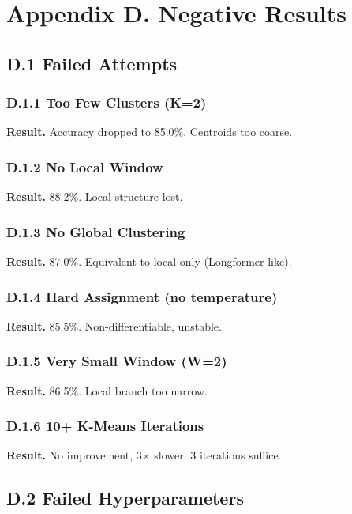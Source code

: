 \section{Appendix D. Negative Results}

\subsection{D.1 Failed Attempts}

\subsubsection{D.1.1 Too Few Clusters (K=2)}

\textbf{Result.} Accuracy dropped to 85.0\%. Centroids too coarse.

\subsubsection{D.1.2 No Local Window}

\textbf{Result.} 88.2\%. Local structure lost.

\subsubsection{D.1.3 No Global Clustering}

\textbf{Result.} 87.0\%. Equivalent to local-only (Longformer-like).

\subsubsection{D.1.4 Hard Assignment (no temperature)}

\textbf{Result.} 85.5\%. Non-differentiable, unstable.

\subsubsection{D.1.5 Very Small Window (W=2)}

\textbf{Result.} 86.5\%. Local branch too narrow.

\subsubsection{D.1.6 10+ K-Means Iterations}

\textbf{Result.} No improvement, 3$\times$ slower. 3 iterations suffice.

\subsection{D.2 Failed Hyperparameters}

